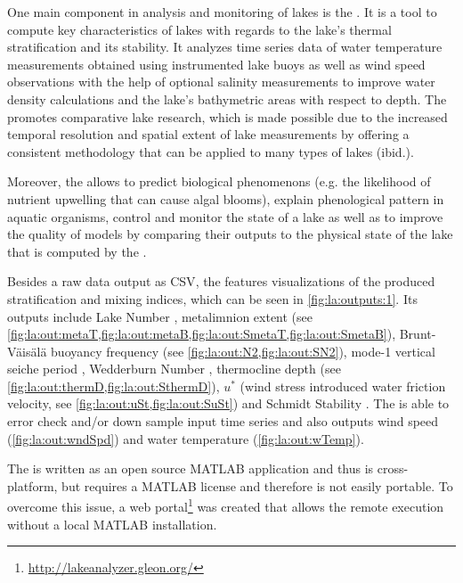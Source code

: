 One main component in analysis and monitoring of lakes is the \la \citep{read2011derivation}. It is a tool to compute key characteristics of lakes with regards to the lake's thermal stratification and its stability. It analyzes time series data of water temperature measurements obtained using instrumented lake buoys as well as wind speed observations with the help of optional salinity measurements to improve water density calculations and the lake's bathymetric areas with respect to depth. The \la promotes comparative lake research, which is made possible due to the increased temporal resolution and spatial extent of lake measurements by offering a consistent methodology that can be applied to many types of lakes (ibid.).

Moreover, the \la allows to predict biological phenomenons (e.g. the likelihood of nutrient upwelling that can cause algal blooms), explain phenological pattern in aquatic organisms, control and monitor the state of a lake as well as to improve the quality of models by comparing their outputs to the physical state of the lake that is computed by the \la.



Besides a raw data output as \ac{CSV}, the \la features visualizations of the produced stratification and mixing indices, which can be seen in \cref{fig:la:outputs:1}. Its outputs include Lake Number \citep[see \cref{fig:la:out:Ln,fig:la:out:SLn},][]{imberger1990}, metalimnion extent (see \cref{fig:la:out:metaT,fig:la:out:metaB,fig:la:out:SmetaT,fig:la:out:SmetaB}), Brunt-Väisälä buoyancy frequency (see \cref{fig:la:out:N2,fig:la:out:SN2}), mode-1 vertical seiche period \citep[see \cref{fig:la:out:T1,fig:la:out:ST1},][]{monismith1986}, Wedderburn Number \citep[see \cref{fig:la:out:W,fig:la:out:SW},][]{thompson1980}, thermocline depth (see \cref{fig:la:out:thermD,fig:la:out:SthermD}), $u^{*}$ (wind stress introduced water friction velocity, see \cref{fig:la:out:uSt,fig:la:out:SuSt}) and Schmidt Stability \citep[see \cref{fig:la:out:St},][]{schmidt1928,hutchinson1957,idso1973}. The \la is able to error check and/or down sample input time series and also outputs wind speed (\cref{fig:la:out:wndSpd}) and water temperature (\cref{fig:la:out:wTemp}).

The \la is written as an open source MATLAB application and thus is cross-platform, but requires a MATLAB license and therefore is not easily portable. To overcome this issue, a web portal\footnote{\url{http://lakeanalyzer.gleon.org/} \lastretrievedp} was created that allows the remote \la execution without a local MATLAB installation.

